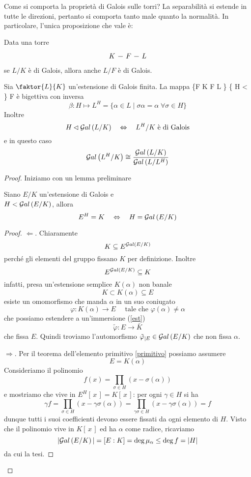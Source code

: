 \begin{multicols}{2}
	\begin{remark}
		Come si comporta la proprietà di Galois sulle torri? La separabilità si estende in tutte le direzioni, pertanto si comporta tanto male quanto la normalità. In particolare, l'unica proposizione che vale è:	 
	\end{remark}
\begin{prop}
	Data una torre 
	\[\begin{tikzcd}[column sep=0.25cm]
	K \arrow [r,-] &
	F \arrow [r,-] &
	L
	\end{tikzcd} \] se $ L/K $ è di Galois, allora anche $ L/F $ è di Galois.
\end{prop}
	\columnbreak
	\begin{theorem}[di corrispondenza]\label{corrgall}
		Sia $ \faktor{L}{K} $ un'estensione di Galois finita. La mappa
		\fun{\alpha}
		{\{F  \mid K \subseteq F \subseteq L \}}
		{\left\{ H <  \right\}}
		{F}
		{}
		è bigettiva con inversa
		\[ \beta: H \mapsto L^H = \{ \alpha \in L \mid \sigma\alpha = \alpha \;\forall \sigma \in H \} \]
		Inoltre
		\[ H \lhd \mathcal{G}al\left( L/K \right) \quad\Leftrightarrow\quad L^H/K \text{ è di Galois} \]
		e in questo caso
		\[ \mathcal{G}al\left( L^H/K \right) \cong \dfrac{\mathcal{G}al\left( L/K \right)}{\mathcal{G}al\left( L/L^H \right)} \]
		
	\end{theorem}
	\begin{proof}
		Iniziamo con un lemma preliminare
	\begin{prop}\label{cosetta1}
		Siano $ E/K $ un'estensione di Galois e\\ $ H < \mathcal{G}al\left( E/K \right) $, allora
		\[  E^H = K \quad\Leftrightarrow\quad H = \mathcal{G}al\left( E/K \right)  \]
	\end{prop}
	\begin{proof}
		$ \Leftarrow $. Chiaramente 
		\[ K \subseteq E^{\mathcal{G}al\left( E/K \right)} \]
	perché gli elementi del gruppo fissano $ K $ per definizione.
	Inoltre \[ E^{\mathcal{G}al\left( E/K \right)} \subseteq K \]
	infatti, presa un'estensione semplice $ K(\alpha) $ non banale
	\[ K \subset K(\alpha) \subseteq E \]
	esiste un omomorfismo che manda $ \alpha $ in un suo coniugato
	\[ \varphi: K(\alpha) \to E \quad\text{ tale che } \varphi(\alpha)\neq \alpha \]
	che possiamo estendere a un'immersione (\ref{est})
	\[ \tilde{\varphi}: E \to \bar{K} \]
	che fissa $ E $.
	Quindi troviamo l'automorfismo $ \tilde{\varphi}_{|E} \in \mathcal{G}al\left( E/K \right) $ che non fissa $ \alpha $.
	
	$ \Rightarrow $. Per il teorema dell'elemento primitivo \ref{primitivo} possiamo assumere
	\[ E = K(\alpha) \]
	Consideriamo il polinomio
	\[ f(x) = \prod_{\sigma \in H}{(x - \sigma(\alpha))} \]
	e mostriamo che vive in $ E^H[\, x\,] = K[\, x\,] $: per ogni $ \gamma \in H $ si ha
	\[ \gamma f = \prod_{\sigma \in H}{(x - \gamma\sigma(\alpha))} = \prod_{\gamma\sigma \in H}{(x - \gamma\sigma(\alpha))} = f \]
	dunque tutti i suoi coefficienti devono essere fissati da ogni elemento di $ H $.
	Visto che il polinomio vive in $ K[\, x\,] $ ed ha $ \alpha $ come radice, ricaviamo
	\[ |\mathcal{G}al\left( E/K \right)| = [E:K] = \deg \mu_\alpha \leq \deg f = |H| \]
	da cui la tesi.
	\end{proof}


\end{proof}
\end{multicols}
